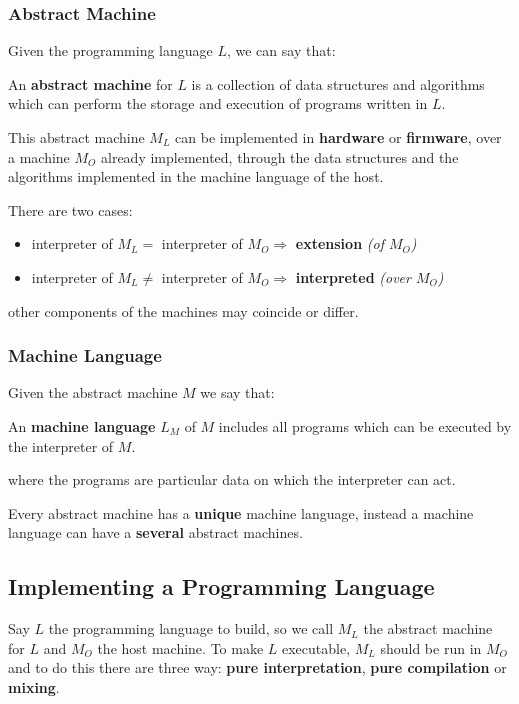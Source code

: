 \subsubsection{Abstract Machine}
Given the programming language \(L\), we can say that:
\begin{definition}
An \textbf{abstract machine} for \(L\) is a collection of data structures and
algorithms which can perform the storage and execution of programs written in
\(L\).
\end{definition}

This abstract machine \(M_L\) can be implemented in \textbf{hardware} or
\textbf{firmware}, over a machine \(M_O\) already implemented, through the
data structures and the algorithms implemented in the machine language of the
host.

There are two cases:
\begin{itemize}
\item interpreter of \(M_L =\) interpreter of \(M_O \Rightarrow\)
\textbf{extension} \textit{(of \(M_O\))}
\item interpreter of \(M_L \neq\) interpreter of \(M_O \Rightarrow\)
\textbf{interpreted} \textit{(over \(M_O\))}
\end{itemize}

other components of the machines may coincide or differ.

\subsubsection{Machine Language}
Given the abstract machine \(M\) we say that:
\begin{definition}
An \textbf{machine language} \(L_M\) of \(M\) includes all programs which can be
executed by the interpreter of \(M\).
\end{definition}

where the programs are particular data on which the interpreter can act.

Every abstract machine has a \textbf{unique} machine language, instead a machine
language can have a \textbf{several} abstract machines.

\subsection{Implementing a Programming Language}
Say \(L\) the programming language to build, so we call \(M_L\) the abstract
machine for \(L\) and \(M_O\) the host machine. To make \(L\) executable,
\(M_L\) should be run in \(M_O\) and to do this there are three way:
\textbf{pure interpretation}, \textbf{pure compilation} or \textbf{mixing}.

